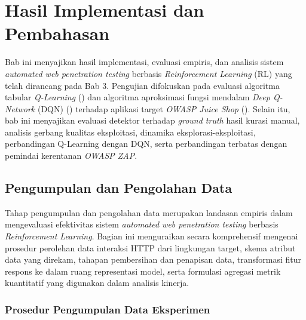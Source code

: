 \chapter{Hasil Implementasi dan Pembahasan}

Bab ini menyajikan hasil implementasi, evaluasi empiris, dan analisis sistem \textit{automated web penetration testing} berbasis \textit{Reinforcement Learning} (RL) yang telah dirancang pada Bab 3. Pengujian difokuskan pada evaluasi algoritma tabular \textit{Q-Learning} (\cite{watkins1992qlearning,sutton2018}) dan algoritma aproksimasi fungsi mendalam \textit{Deep Q-Network} (DQN) (\cite{mnih2015dqn}) terhadap aplikasi target \textit{OWASP Juice Shop} (\cite{owaspJuiceShop}). Selain itu, bab ini menyajikan evaluasi detektor terhadap \textit{ground truth} hasil kurasi manual, analisis gerbang kualitas eksploitasi, dinamika eksplorasi-eksploitasi, perbandingan Q-Learning dengan DQN, serta perbandingan terbatas dengan pemindai kerentanan \textit{OWASP ZAP}.

\section{Pengumpulan dan Pengolahan Data}

Tahap pengumpulan dan pengolahan data merupakan landasan empiris dalam mengevaluasi efektivitas sistem \textit{automated web penetration testing} berbasis \textit{Reinforcement Learning}. Bagian ini menguraikan secara komprehensif mengenai prosedur perolehan data interaksi HTTP dari lingkungan target, skema atribut data yang direkam, tahapan pembersihan dan penapisan data, transformasi fitur respons ke dalam ruang representasi model, serta formulasi agregasi metrik kuantitatif yang digunakan dalam analisis kinerja.

\subsection{Prosedur Pengumpulan Data Eksperimen}

